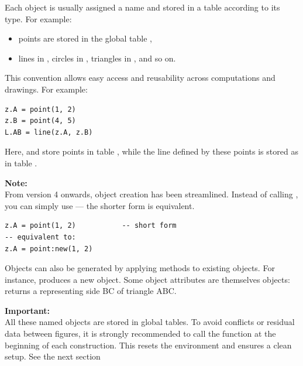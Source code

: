 Each object is usually assigned a name and stored in a table according to its type. For example:
\begin{itemize}
  \item points are stored in the global table ,
  \item lines in , circles in , triangles in , and so on.
\end{itemize}

This convention allows easy access and reusability across computations and drawings. For example:

\begin{mybox}
\begin{verbatim}
z.A = point(1, 2)
z.B = point(4, 5)
L.AB = line(z.A, z.B)
\end{verbatim}
\end{mybox}


Here,  and  store points in table , while the line defined by these points is stored as  in table .

\vspace{1em}
\tkzRHand{} \textbf{Note:} \\
From version 4 onwards, object creation has been streamlined. Instead of calling , you can simply use  — the shorter form is equivalent.

\begin{mybox}
\begin{verbatim}
z.A = point(1, 2)           -- short form
-- equivalent to:
z.A = point:new(1, 2)
\end{verbatim}
\end{mybox}

Objects can also be generated by applying methods to existing objects. For instance,  produces a new  object. Some object attributes are themselves objects:  returns a  representing side BC of triangle ABC.

\vspace{1em}
\tkzRHand{} \textbf{Important:} \\
All these named objects are stored in global tables. To avoid conflicts or residual data between figures, it is strongly recommended to call the function  at the beginning of each construction. This resets the environment and ensures a clean setup. See the next section

